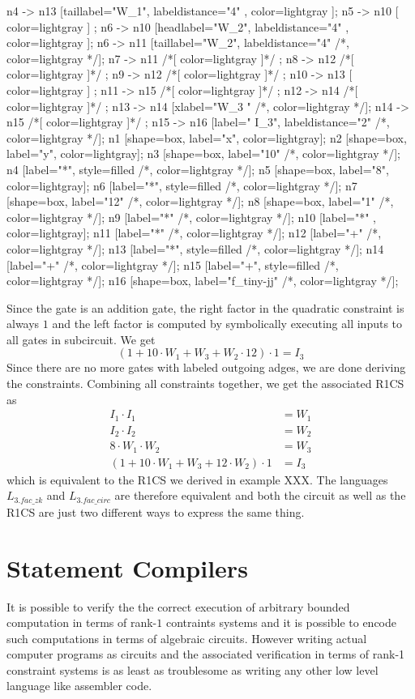\begin{example}
\begin{center}
{	n4 -> n13 [taillabel="W_1", labeldistance="4" , color=lightgray ];
	n5 -> n10 [ color=lightgray ] ;
	n6 -> n10 [headlabel="W_2", labeldistance="4" , color=lightgray ];
	n6 -> n11 [taillabel="W_2", labeldistance="4" /*, color=lightgray */];
	n7 -> n11 /*[ color=lightgray ]*/ ;
	n8 -> n12 /*[ color=lightgray ]*/ ;
	n9 -> n12 /*[ color=lightgray ]*/ ;
	n10 -> n13 [ color=lightgray ] ; 
	n11 -> n15 /*[ color=lightgray ]*/ ;
	n12 -> n14 /*[ color=lightgray ]*/ ;	
	n13 -> n14 [xlabel="W_3  "  /*, color=lightgray */];
	n14 -> n15 /*[ color=lightgray ]*/ ;
	n15 -> n16 [label="  I_3", labeldistance="2" /*, color=lightgray */];
	n1 [shape=box, label="x", color=lightgray];
	n2 [shape=box, label="y", color=lightgray];
	n3 [shape=box, label="10" /*, color=lightgray */];
	n4 [label="*", style=filled /*, color=lightgray */];
	n5 [shape=box, label="8", color=lightgray];
	n6 [label="*", style=filled /*, color=lightgray */];
	n7 [shape=box, label="12" /*, color=lightgray */];
	n8 [shape=box, label="1" /*, color=lightgray */];
	n9 [label="*" /*, color=lightgray */];
	n10 [label="*" , color=lightgray];
	n11 [label="*" /*, color=lightgray */];	
	n12 [label="+" /*, color=lightgray */];	
	n13 [label="*", style=filled /*, color=lightgray */];
	n14 [label="+" /*, color=lightgray */];
	n15 [label="+", style=filled /*, color=lightgray */];
	n16 [shape=box, label="f_tiny-jj" /*, color=lightgray */];		
}
\end{center}
Since the gate is an addition gate, the right factor in the quadratic constraint is always $1$ and the left factor is computed by symbolically executing all inputs to all gates in subcircuit. We get
$$
(1 + 10\cdot W_1 + W_3 + W_2\cdot 12)\cdot 1 = I_3
$$
Since there are no more gates with labeled outgoing adges, we are done deriving the constraints. Combining all constraints together, we get the associated R1CS as
\begin{align*}
 I_1 \cdot I_1 &= W_1\\
 I_2 \cdot I_2 &= W_2\\
 8\cdot W_1\cdot W_2 &= W_3\\
 (1 + 10\cdot W_1 + W_3 + 12\cdot W_2)\cdot 1 &= I_3
\end{align*}
which is equivalent to the R1CS we derived in example XXX. The languages $L_{3.fac\_zk}$ and $L_{3.fac\_circ}$ are therefore equivalent and both the circuit as well as the R1CS are just two different ways to express the same thing.
\end{example}
\section{Statement Compilers} It is possible to verify the the correct execution of arbitrary bounded computation in terms of rank-$1$ contraints systems and it is possible to encode such computations in terms of algebraic circuits. However writing actual computer programs as circuits and the associated verification in terms of rank-1 constraint systems is as least as troublesome as writing any other low level language like assembler code. 


